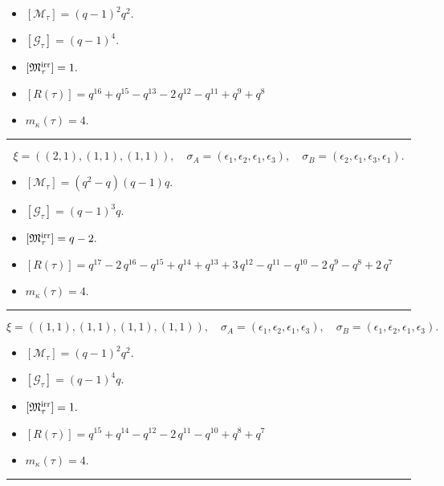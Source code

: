 \documentclass[10pt,a4paper]{amsart}
\begin{document}
\begin{itemize}
 \item $[\mathcal{M}_{\tau}] = {\left(q - 1\right)}^{2} q^{2} .$

 \item $[\mathcal{G}_{\tau}] = {\left(q - 1\right)}^{4} .$

 \item $[{\frak M}_{\tau}^{\textrm{irr}}] = 1 .$

 \item $[R(\tau)] = q^{16} + q^{15} - q^{13} - 2 \, q^{12} - q^{11} + q^{9} + q^{8} $

 \item $m_{\kappa}(\tau) = 4 .$

 \end{itemize}
\noindent\rule{8cm}{0.4pt}

$$\xi = ({(2, 1)}, {(1, 1)}, {(1, 1)}),\quad \sigma_A = ({{\epsilon_1, \epsilon_2}}, {{\epsilon_1}}, {{\epsilon_3}}),\quad \sigma_B = ({{\epsilon_2, \epsilon_1}}, {{\epsilon_3}}, {{\epsilon_1}}).$$

\begin{itemize}
 \item $[\mathcal{M}_{\tau}] = {\left(q^{2} - q\right)} {\left(q - 1\right)} q .$

 \item $[\mathcal{G}_{\tau}] = {\left(q - 1\right)}^{3} q .$

 \item $[{\frak M}_{\tau}^{\textrm{irr}}] = q - 2 .$

 \item $[R(\tau)] = q^{17} - 2 \, q^{16} - q^{15} + q^{14} + q^{13} + 3 \, q^{12} - q^{11} - q^{10} - 2 \, q^{9} - q^{8} + 2 \, q^{7} $

 \item $m_{\kappa}(\tau) = 4 .$

 \end{itemize}
\noindent\rule{8cm}{0.4pt}

$$\xi = ({(1, 1), (1, 1)}, {(1, 1)}, {(1, 1)}),\quad \sigma_A = ({{\epsilon_1}, {\epsilon_2}}, {{\epsilon_1}}, {{\epsilon_3}}),\quad \sigma_B = ({{\epsilon_1}, {\epsilon_2}}, {{\epsilon_1}}, {{\epsilon_3}}).$$

\begin{itemize}
 \item $[\mathcal{M}_{\tau}] = {\left(q - 1\right)}^{2} q^{2} .$

 \item $[\mathcal{G}_{\tau}] = {\left(q - 1\right)}^{4} q .$

 \item $[{\frak M}_{\tau}^{\textrm{irr}}] = 1 .$

 \item $[R(\tau)] = q^{15} + q^{14} - q^{12} - 2 \, q^{11} - q^{10} + q^{8} + q^{7} $

 \item $m_{\kappa}(\tau) = 4 .$

 \end{itemize}
\noindent\rule{8cm}{0.4pt}
\end{document}
